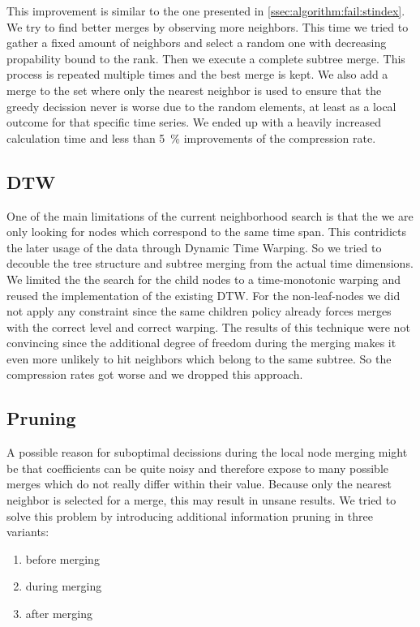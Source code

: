 This improvement is similar to the one presented in \autoref{ssec:algorithm:fail:stindex}. We try to find better merges by observing more neighbors. This time we tried to gather a fixed amount of neighbors and select a random one with decreasing propability bound to the rank. Then we execute a complete subtree merge. This process is repeated multiple times and the best merge is kept. We also add a merge to the set where only the nearest neighbor is used to ensure that the greedy decission never is worse due to the random elements, at least as a local outcome for that specific time series. We ended up with a heavily increased calculation time and less than \SI{5}{\percent} improvements of the compression rate.


\subsection{DTW}
\label{ssec:algorithm:fail:dtw}

One of the main limitations of the current neighborhood search is that the we are only looking for nodes which correspond to the same time span. This contridicts the later usage of the data through Dynamic Time Warping. So we tried to decouble the tree structure and subtree merging from the actual time dimensions. We limited the the search for the child nodes to a time-monotonic warping and reused the implementation of the existing DTW. For the non-leaf-nodes we did not apply any constraint since the same children policy already forces merges with the correct level and correct warping. The results of this technique were not convincing since the additional degree of freedom during the merging makes it even more unlikely to hit neighbors which belong to the same subtree. So the compression rates got worse and we dropped this approach.


\subsection{Pruning}
\label{ssec:algorithm:fail:pruning}

A possible reason for suboptimal decissions during the local node merging might be that coefficients can be quite noisy and therefore expose to many possible merges which do not really differ within their value. Because only the nearest neighbor is selected for a merge, this may result in unsane results. We tried to solve this problem by introducing additional information pruning in three variants:

\begin{enumerate}
    \item before merging
    \item during merging
    \item after merging
\end{enumerate}

